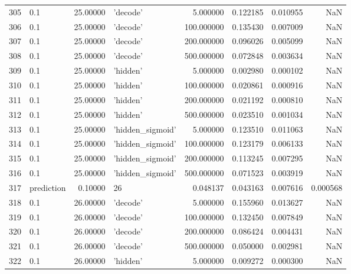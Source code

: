\documentclass[10pt,a4paper]{article}
\begin{document}
\begin{tabular}{llrlrrrr}
305  &         0.1 &  25.00000 &           'decode' &    5.000000 &  0.122185 &  0.010955 &       NaN \\
306  &         0.1 &  25.00000 &           'decode' &  100.000000 &  0.135430 &  0.007009 &       NaN \\
307  &         0.1 &  25.00000 &           'decode' &  200.000000 &  0.096026 &  0.005099 &       NaN \\
308  &         0.1 &  25.00000 &           'decode' &  500.000000 &  0.072848 &  0.003634 &       NaN \\
309  &         0.1 &  25.00000 &           'hidden' &    5.000000 &  0.002980 &  0.000102 &       NaN \\
310  &         0.1 &  25.00000 &           'hidden' &  100.000000 &  0.020861 &  0.000916 &       NaN \\
311  &         0.1 &  25.00000 &           'hidden' &  200.000000 &  0.021192 &  0.000810 &       NaN \\
312  &         0.1 &  25.00000 &           'hidden' &  500.000000 &  0.023510 &  0.001034 &       NaN \\
313  &         0.1 &  25.00000 &   'hidden\_sigmoid' &    5.000000 &  0.123510 &  0.011063 &       NaN \\
314  &         0.1 &  25.00000 &   'hidden\_sigmoid' &  100.000000 &  0.123179 &  0.006133 &       NaN \\
315  &         0.1 &  25.00000 &   'hidden\_sigmoid' &  200.000000 &  0.113245 &  0.007295 &       NaN \\
316  &         0.1 &  25.00000 &   'hidden\_sigmoid' &  500.000000 &  0.071523 &  0.003919 &       NaN \\
317  &  prediction &   0.10000 &                 26 &    0.048137 &  0.043163 &  0.007616 &  0.000568 \\
318  &         0.1 &  26.00000 &           'decode' &    5.000000 &  0.155960 &  0.013627 &       NaN \\
319  &         0.1 &  26.00000 &           'decode' &  100.000000 &  0.132450 &  0.007849 &       NaN \\
320  &         0.1 &  26.00000 &           'decode' &  200.000000 &  0.086424 &  0.004431 &       NaN \\
321  &         0.1 &  26.00000 &           'decode' &  500.000000 &  0.050000 &  0.002981 &       NaN \\
322  &         0.1 &  26.00000 &           'hidden' &    5.000000 &  0.009272 &  0.000300 &       NaN \\

\end{tabular}
\end{document}
